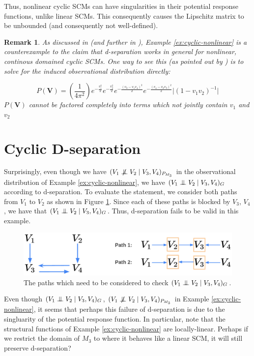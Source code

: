 \documentclass[letterpaper,10pt]{article}
\newtheorem{remark}{Remark}
\newcommand{\CI}{\mathrel{\perp\mspace{-10mu}\perp}}
\newcommand{\nCI}{\centernot{\CI}}
\begin{document}
Thus, nonlinear cyclic SCMs can have singularities in their potential response functions, unlike linear SCMs. This consequently causes the Lipschitz matrix to be unbounded (and consequently not well-defined).


\begin{remark}
As discussed in \cite{Acyclification} (and further in \cite{Foundations}), Example \ref{ex:cyclic-nonlinear} is a counterexample to the claim that d-separation works in general for nonlinear, continous domained cyclic SCMs.
One way to see this (as pointed out by \cite{Acyclification}) is to solve for the induced observational distribution directly:

\[
P(\mathbf{V})=(\frac{1}{4\pi^2})e^{-\frac{v_1^2}{2}}e^{-\frac{v_2^2}{2}}e^{-\frac{(v_3-v_1v_4)^2}{2}}e^{-\frac{(v_4-v_2v_3)^2}{2}}\lvert(1-v_1v_2)^{-1}\rvert
\]
$P(\mathbf{V})$ cannot be factored completely into terms which not jointly contain $v_1$ and $v_2$
\end{remark}

\section{Cyclic D-separation}\label{cyclic-d-sep}

Surprisingly, even though we have $(V_1 \nCI V_2 \mid V_3,V_4)_{P_{M_3}}$ in the observational distribution of Example \ref{ex:cyclic-nonlinear}, we have $(V_1 \CI V_2 \mid V_3,V_4)_{G}$ according to d-separation. To evaluate the statement, we consider both paths from $V_1$ to $V_2$ as shown in Figure \ref{fig:paths}. Since each of these paths is blocked by $V_3$, $V_4$, we have that $(V_1 \CI V_2 \mid V_3,V_4)_{G}$.
Thus, d-separation fails to be valid in this example.

\begin{figure}
\centering
\includegraphics[width=0.7\linewidth]{pics/my_own/paths.png}
\caption{The paths which need to be considered to check $(V_1 \CI V_2 \mid V_3,V_4)_{G}$.}
\label{fig:paths}
\end{figure}


Even though $(V_1 \CI V_2 \mid V_3,V_4)_{G}$, $(V_1 \nCI V_2 \mid V_3,V_4)_{P_{M_3}}$ in Example \ref{ex:cyclic-nonlinear}, it seems that perhaps this failure of d-separation is due to the singluarity of the potential response function. 
In particular, note that the structural functions of Example \ref{ex:cyclic-nonlinear} are locally-linear. Perhaps if we restrict the domain of $M_3$ to where it behaves like a linear SCM, it will still preserve d-separation?
\end{document}
